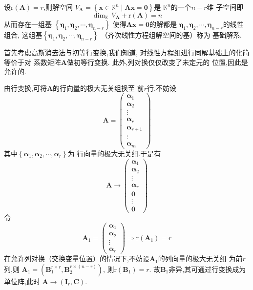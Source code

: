 \begin{formal}
\begin{theorem}[基础解系]\label{thm:基础解系}
    设$\mathrm{r}\left(\bm{A}
    \right)=r$,则解空间
    $V_{\bm{A}} = 
    \left\{
        \bm{x} \in \mathbb{K}^n\mid
        \bm{Ax} =\bm{0}
    \right\}$是
    $\mathbb{K}^n$的一个$n  -r$维
    子空间即
    \[
    \dim_{\mathbb{K}}\,V_{\bm{A}} + 
    \mathrm{r}\left(\bm{A}\right)
    = n
    \]
    从而存在一组基
    $\left\{\bm{\eta}_1,\bm{\eta}_2,\cdots
    ,\bm{\eta}_{n - r}\right\}$
    使得$\bm{Ax}=\bm{0}$的解都是
    $\bm{\eta}_1,\bm{\eta}_2,\cdots,
    \bm{\eta}_{n - r}$的线性组合,
    这组基$\left\{\bm{\eta}_1,\bm{\eta}_2,\cdots
    ,\bm{\eta}_{n - r}\right\}$
    （齐次线性方程组解空间的基）称为
    基础解系.
\end{theorem}
\begin{Proof}
首先考虑高斯消去法与初等行变换,我们知道,
对线性方程组进行同解基础上的化简等价于对
系数矩阵$\bm{A}$做初等行变换.
此外,列对换仅仅改变了未定元的
位置,因此是允许的.

由行变换,可将$\bm{A}$的行向量的极大无关组换至
前$r$行.不妨设
\[
\bm{A}=\begin{pmatrix}
    \bm{\alpha}_1\\
    \bm{\alpha}_2\\
    \vdots\\
    \bm{\alpha}_r\\
    \bm{\alpha}_{r+1}\\
    \vdots\\
    \bm{\alpha}_m
\end{pmatrix}
\]
其中$\left\{\bm{\alpha}_1,
\bm{\alpha}_2,
\cdots,\bm{\alpha}_r\right\}$为
行向量的极大无关组.于是有
\[
\bm{A}\longrightarrow
\begin{pmatrix}
    \bm{\alpha}_1\\
    \bm{\alpha}_2\\
    \vdots\\
    \bm{\alpha}_r\\
    \bm{0}\\
    \vdots\\
    \bm{0}
\end{pmatrix}
\]
令\[
\bm{A}_1=\begin{pmatrix}
    \bm{\alpha}_1\\\bm{\alpha}_2\\\vdots\\\bm{\alpha}_r
\end{pmatrix}\Longrightarrow
\mathrm{r}\left(\bm{A}_1\right)=r
\]
在允许列对换（交换变量位置）的情况下,不妨设$\bm{A}_1$的列向量的极大无关组
为前$r$列,则
$\bm{A}_1=\left(\bm{B}_1^{r\times r}
,\bm{B}_2^{r\times \left(n-r\right)}\right)$,
则$\mathrm{r}\left(\bm{B}_1\right)=r.$
故$\bm{B}_1$非异,其可通过行变换成为单位阵,此时
$\bm{A}\longrightarrow \left(\bm{I}_r,
\bm{C}\right)$.


\end{Proof}
\end{formal}
